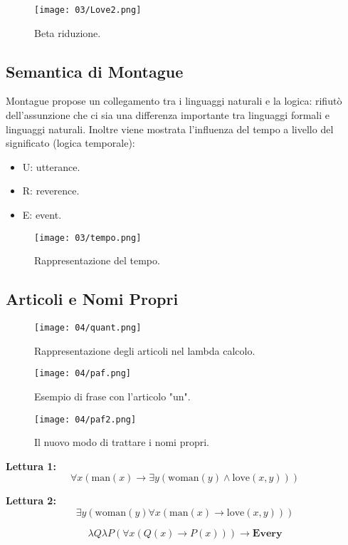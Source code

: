 \begin{figure}[!h]
    \centering
    \texttt{[image: 03/Love2.png]}
    \caption{Beta riduzione.}
\end{figure}

\subsection{Semantica di Montague}

Montague propose un collegamento tra i linguaggi naturali e la logica: rifiutò dell'assunzione che ci sia una differenza importante tra linguaggi formali e linguaggi naturali. Inoltre viene mostrata l'influenza del tempo a livello del significato (logica temporale):

\begin{itemize}
  \item U: utterance. 
  \item R: reverence. 
  \item E: event.
\end{itemize}


\begin{figure}[!h]
    \centering
    \texttt{[image: 03/tempo.png]}
    \caption{Rappresentazione del tempo.}
\end{figure}
\pagebreak
\subsection{Articoli e Nomi Propri}
\begin{figure}[!h]
    \centering
    \texttt{[image: 04/quant.png]}
    \caption{Rappresentazione degli articoli nel lambda calcolo.}
\end{figure}

\begin{figure}[!h]
    \centering
    \texttt{[image: 04/paf.png]}
    \caption{Esempio di frase con l'articolo "un".}
\end{figure}

\begin{figure}[!h]
    \centering
    \texttt{[image: 04/paf2.png]}
    \caption{Il nuovo modo di trattare i nomi propri.}
\end{figure}


\textbf{Lettura 1:}
\[
\forall x (\text{man}(x) \to \exists y (\text{woman}(y) \wedge \text{love}(x, y)))
\]

\textbf{Lettura 2:}
\[
\exists y (\text{woman}(y) \forall x (\text{man}(x) \to \text{love}(x, y)))
\]

\[
\boxed{\lambda Q \lambda P (\forall x (Q(x) \to P(x))) \to \textbf{Every}}
\]

